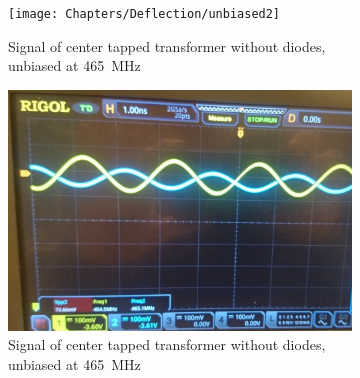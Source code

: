 \begin{figure}
	\centering
	\begin{subfigure}{.5\textwidth}
		\centering
		\texttt{[image: Chapters/Deflection/unbiased2]}
		\caption{Signal of center tapped transformer without diodes, unbiased at \SI{465}{\mega\hertz}}
		\label{fig:unbiased2}
	\end{subfigure}%
	\begin{subfigure}{.5\textwidth}
		\centering
		\includegraphics[height=0.2\textheight]{Chapters/Deflection/biased2}
		\caption{Signal of center tapped transformer without diodes, unbiased at \SI{465}{\mega\hertz}}
		\label{fig:biased2}
	\end{subfigure}
	\caption{}
	\label{fig:CTTSignal}
\end{figure}



